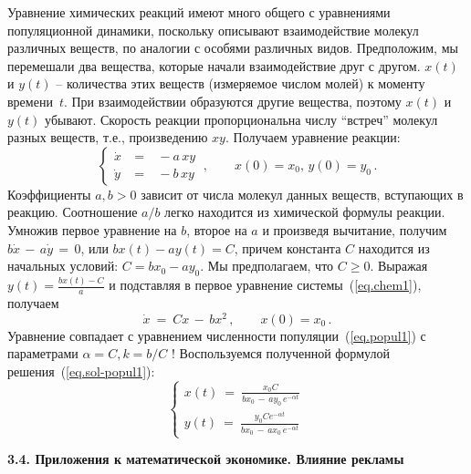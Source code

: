 \documentclass[12pt,a4paper]{article}
\begin{document}
Уравнение химических реакций имеют много общего с уравнениями популяционной динамики, поскольку описывают взаимодействие
молекул различных веществ, по аналогии с особями различных  видов. Предположим, мы перемешали два вещества, которые начали взаимодействие друг с другом. $x(t)$ и $y(t)$ -- количества этих веществ (измеряемое числом молей) к моменту времени~$t$.
При взаимодействии образуются другие вещества, поэтому $x(t)$ и $y(t)$ убывают. Скорость реакции
пропорциональна числу ``встреч'' молекул разных веществ, т.е., произведению $xy$.
Получаем уравнение реакции:
\begin{equation}\label{eq.chem1}
\left\{
\begin{array}{ccc}
\dot x \ & = & \ - a \, xy \\
\dot y\ & = & \ - b \, xy
\end{array}
\ , \qquad x(0) = x_0, \, y(0) = y_0\, .
\right.
\end{equation}
Коэффициенты $a, b > 0$ зависит от числа молекул данных веществ, вступающих в реакцию.
Соотношение $a/b$ легко находится из химической формулы реакции.
Умножив первое уравнение на $b$,  второе на $a$ и произведя вычитание,
получим $b \dot x \, - \, a \dot y \, = \, 0$, или $bx(t) - ay(t) = C$,
причем константа $C$ находится из начальных условий: $C = bx_0 - ay_0$.
Мы предполагаем, что $C \ge 0$.
Выражая $y(t) = \frac{b x (t) - C}{a}$ и подставляя в первое уравнение системы~(\ref{eq.chem1}),
получаем
$$
\dot x \ = \ C x \, - \, b x^2\, , \qquad x(0) = x_0\, .
$$
Уравнение совпадает с уравнением численности популяции~(\ref{eq.popul1}) с параметрами
$\alpha = C, k = b/C$ ! Воспользуемся полученной формулой решения~(\ref{eq.sol-popul1}):
\begin{equation}\label{eq.sol-chem1}
\left\{
\begin{array}{l}
x(t)\ = \ \frac{x_0C}{bx_0 \, - \, ay_0\, e^{-\alpha t}}\, \\
y(t)\ = \ \frac{y_0Ce^{-\alpha t}}{bx_0 \, - \, ax_0\, e^{-\alpha t}}
\end{array}
\right.
\end{equation}
\bigskip

\newpage 

\begin{center}
\textbf{3.4. Приложения к математической экономике. Влияние рекламы}
\end{center}

\bigskip
\end{document}
